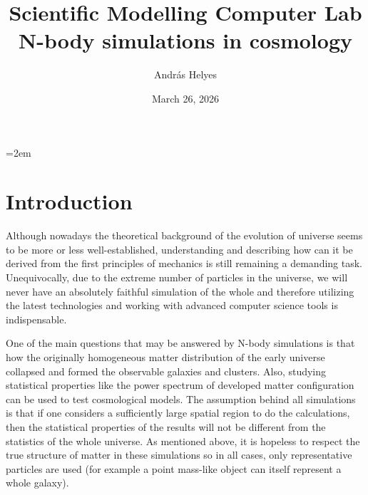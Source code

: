 \documentclass[12pt]{article}
\title{\large Scientific Modelling Computer Lab \huge\\[0.4ex] N-body simulations in cosmology\vspace{-0.5cm}}
\author[1]{András Helyes\vspace{-0.65cm}}
\affil[1]{Physics MSc, Eötvös Loránd University, Budapest, Hungary.\vspace{-0.5cm}}
\date{March 26, 2026\vspace{-0.4cm}}
\begin{document}
\emergencystretch=2em



\section{Introduction}
Although nowadays the theoretical background of the evolution of universe seems to be more or less well-established, understanding and describing how can it be derived from the first principles of mechanics is still remaining a demanding task. Unequivocally, due to the extreme number of particles in the universe, we will never have an absolutely faithful simulation of the whole and therefore utilizing the latest technologies and working with advanced computer science tools is indispensable.

One of the main questions that may be answered by N-body simulations is that how the originally homogeneous matter distribution of the early universe collapsed and formed the observable galaxies and clusters. Also, studying statistical properties like the power spectrum of developed matter configuration can be used to test cosmological models. The assumption behind all simulations is that if one considers a sufficiently large spatial region to do the calculations, then the statistical properties of the results will not be different from the statistics of the whole universe. As mentioned above, it is hopeless to respect the true structure of matter in these simulations so in all cases, only representative particles are used (for example a point mass-like object can itself represent a whole galaxy).
\end{document}
